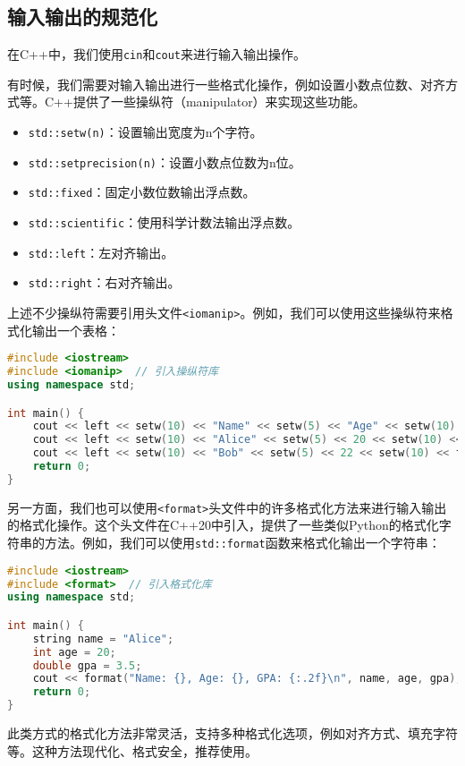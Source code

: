 \subsection{输入输出的规范化}

在C++中，我们使用\texttt{cin}和\texttt{cout}来进行输入输出操作。

有时候，我们需要对输入输出进行一些格式化操作，例如设置小数点位数、对齐方式等。C++提供了一些操纵符（manipulator）来实现这些功能。
\begin{itemize}
  \item \texttt{std::setw(n)}：设置输出宽度为n个字符。
  \item \texttt{std::setprecision(n)}：设置小数点位数为n位。
  \item \texttt{std::fixed}：固定小数位数输出浮点数。
  \item \texttt{std::scientific}：使用科学计数法输出浮点数。
  \item \texttt{std::left}：左对齐输出。
  \item \texttt{std::right}：右对齐输出。
\end{itemize}

上述不少操纵符需要引用头文件\texttt{<iomanip>}。例如，我们可以使用这些操纵符来格式化输出一个表格：
\begin{lstlisting}[language=C++]
#include <iostream>
#include <iomanip>  // 引入操纵符库
using namespace std;

int main() {
    cout << left << setw(10) << "Name" << setw(5) << "Age" << setw(10) << "GPA" << endl;
    cout << left << setw(10) << "Alice" << setw(5) << 20 << setw(10) << fixed << setprecision(2) << 3.5 << endl;
    cout << left << setw(10) << "Bob" << setw(5) << 22 << setw(10) << fixed << setprecision(2) << 3.8 << endl;
    return 0;
}
\end{lstlisting}

另一方面，我们也可以使用\texttt{<format>}头文件中的许多格式化方法来进行输入输出的格式化操作。这个头文件在C++20中引入，提供了一些类似Python的格式化字符串的方法。例如，我们可以使用\texttt{std::format}函数来格式化输出一个字符串：
\begin{lstlisting}[language=C++]
#include <iostream>
#include <format>  // 引入格式化库
using namespace std;

int main() {
    string name = "Alice";
    int age = 20;
    double gpa = 3.5;
    cout << format("Name: {}, Age: {}, GPA: {:.2f}\n", name, age, gpa);
    return 0;
}
\end{lstlisting}
此类方式的格式化方法非常灵活，支持多种格式化选项，例如对齐方式、填充字符等。这种方法现代化、格式安全，推荐使用。

